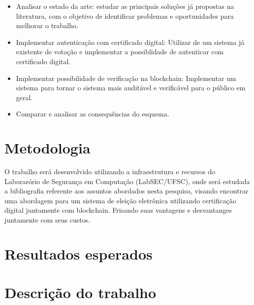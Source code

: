 \documentclass{ufsctex/ufsctex}
\begin{document}
\begin{itemize}
	\item Analisar o estado da arte: estudar as principais soluções
	já propostas na literatura, com o objetivo de identificar problemas
	e oportunidades para melhorar o trabalho.
	\item Implementar autenticação com certificado digital: Utilizar
	de um sistema já existente de votação e implementar a possiblidade
	de autenticar com certificado digital.
	\item Implementar possibilidade de verificação na blockchain:
	Implementar um sistema para tornar o sistema mais auditável e 
	verificável para o público em geral.
	\item Comparar e analisar as consequências do esquema.
\end{itemize}

\section{Metodologia}

O trabalho será desenvolvido utilizando a infraestrutura e recursos do
Laborarório de Segurança em Computação (LabSEC/UFSC), onde será estudada
a bibliografia referente aos assuntos abordados nesta pesquisa, visando
encontrar uma abordagem para um sistema de eleição eletrônica utilizando
certificação digital juntamente com blockchain. Frisando suas vantagens e
desvantanges juntamente com seus custos.

\section{Resultados esperados}

\section{Descrição do trabalho}





\end{document}

